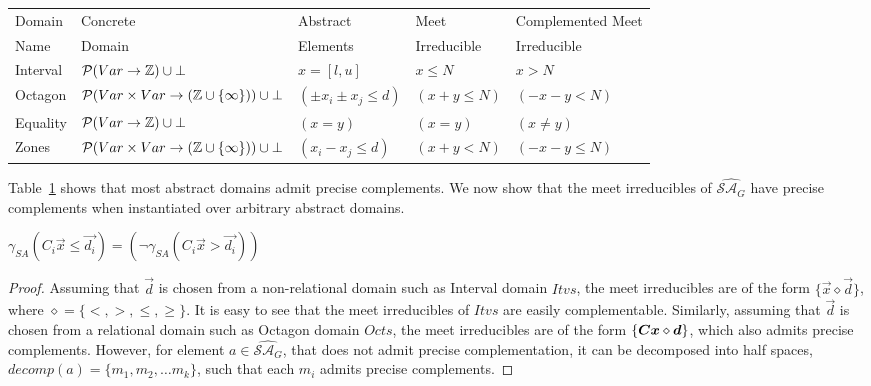 %
\begin{table}
\scriptsize
\begin{center}
{
\begin{tabular}{l|l|l|l|l}
\hline
  Domain & Concrete & Abstract & Meet & Complemented Meet \\ 
  Name  & Domain & Elements & Irreducible & Irreducible \\ \hline
Interval & $\mathcal{P}(Var \rightarrow \mathbb{Z}) \cup \bot$  & $x = [l,u]$ & $x\leq N$ & $x > N$ \\ \hline
Octagon &  $\mathcal{P}(Var \times Var \rightarrow (\mathbb{Z} \cup
\{\infty\})) \cup \bot$ & $(\pm x_i \pm x_j \leq d)$ & $(x+y \leq N)$ & $(-x-y < N)$ \\ \hline
  Equality & $\mathcal{P}(Var \rightarrow \mathbb{Z}) \cup \bot$ & $(x=y)$ &
  $(x=y)$ & $(x \neq y)$ \\ \hline 
 Zones &  $\mathcal{P}(Var \times Var \rightarrow (\mathbb{Z} \cup
\{\infty\})) \cup \bot$ & $(x_i - x_j \leq d)$ & $(x+y < N)$ & $(-x-y \leq N)$ \\ \hline
\end{tabular}
}
\end{center}
\label{fig:complement}
\end{table}
%
Table~\ref{fig:complement} shows that most abstract domains admit precise
complements.  We now show that the meet irreducibles of 
$\widehat{\mathcal{SA}_{G}}$ have precise complements when instantiated over
arbitrary abstract domains. 
%
\begin{proposition} 
  $\gamma_{SA}(C_{i}\vec{x} \leq \vec{d_{i}}) = 
  (\neg \gamma_{SA}(C_{i}\vec{x} > \vec{d_{i}}))$
\end{proposition}
%
\begin{proof}
  Assuming that $\vec{d}$ is chosen from a non-relational domain such as 
  Interval domain $Itvs$, the meet 
  irreducibles are of the form $\{\vec{x} \diamond \vec{d}\}$, where
  $\diamond =
  \{<,>,\leq,\geq\}$. It is easy to see that the meet irreducibles of $Itvs$ are easily
  complementable.  Similarly, assuming that $\vec{d}$ is chosen from a
  relational domain such as Octagon 
  domain $Octs$, the meet irreducibles are of the form $\{\mat{C}\vec{x}
  \diamond \vec{d}\}$, which also admits precise complements.  However, for
  element $a \in \widehat{\mathcal{SA}_{G}}$, that does not admit precise 
  complementation, it can be decomposed into half spaces, 
  $decomp(a)=\{m_1, m_2, \ldots m_k\}$, such that each $m_i$ admits precise
  complements. 
\end{proof}
%
%
